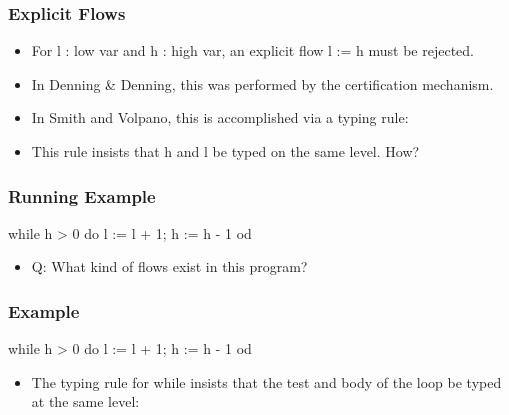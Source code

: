\documentclass{beamer}
\begin{document}
\begin{frame}[fragile]
\frametitle{Explicit Flows}

\begin{itemize}
\item For \<l : low var\> and \<h : high var\>,
      an explicit flow \<l := h\> must be rejected.
\pause
\item In Denning \& Denning, this was performed by the certification mechanism.
\pause
\item In Smith and Volpano, this is accomplished via a typing rule:
\begin{haskell}
\end{haskell} 
\pause 
\item This rule insists that \<h\> and \<l\> be typed on the same level. How?
\end{itemize}

\end{frame}
\begin{frame}[fragile]
\frametitle{Running Example}

\begin{center}
\begin{normalcode}
            while h > 0 do
               l := l + 1;
               h := h - 1
            od 
\end{normalcode}
\end{center}
\pause
\begin{itemize}
\item Q: What kind of flows exist in this program?
\end{itemize}

\end{frame}

\begin{frame}[fragile]
\frametitle{Example}

\begin{center}
\begin{normalcode}
            while h > 0 do
               l := l + 1;
               h := h - 1
            od 
\end{normalcode}
\end{center}
\pause
\begin{itemize}
\item The typing rule for \<while\> insists that the test and body of the loop be typed at the same level:
\begin{haskell}
\end{haskell}
\end{itemize}

\end{frame}
\end{document}
